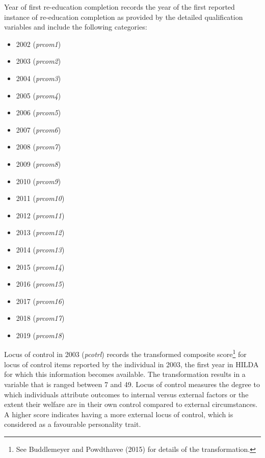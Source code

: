 \documentclass[12pt, a4paper]{article}
\begin{document}
Year of first re-education completion records the year of the first reported instance of re-education completion as provided by the detailed qualification variables and include the following categories:
\begin{itemize}
  \item 2002 (\textit{p\textunderscore{}rcom1})
  \item 2003 (\textit{p\textunderscore{}rcom2})
  \item 2004 (\textit{p\textunderscore{}rcom3})
  \item 2005 (\textit{p\textunderscore{}rcom4})
  \item 2006 (\textit{p\textunderscore{}rcom5})
  \item 2007 (\textit{p\textunderscore{}rcom6})
  \item 2008 (\textit{p\textunderscore{}rcom7})
  \item 2009 (\textit{p\textunderscore{}rcom8})
  \item 2010 (\textit{p\textunderscore{}rcom9})
  \item 2011 (\textit{p\textunderscore{}rcom10})
  \item 2012 (\textit{p\textunderscore{}rcom11})
  \item 2013 (\textit{p\textunderscore{}rcom12})
  \item 2014 (\textit{p\textunderscore{}rcom13})
  \item 2015 (\textit{p\textunderscore{}rcom14})
  \item 2016 (\textit{p\textunderscore{}rcom15})
  \item 2017 (\textit{p\textunderscore{}rcom16})
  \item 2018 (\textit{p\textunderscore{}rcom17})
  \item 2019 (\textit{p\textunderscore{}rcom18})
\end{itemize}  
  
Locus of control in 2003 (\textit{p\textunderscore{}cotrl}) records the transformed composite score\footnote{See Buddlemeyer and Powdthavee (2015) for details of the transformation.} for locus of control items reported by the individual in 2003, the first year in HILDA for which this information becomes available. The transformation results in a variable that is ranged between 7 and 49. Locus of control measures the degree to which individuals attribute outcomes to internal versus external factors or the extent their welfare are in their own control compared to external circumstances. A higher score indicates having a more external locus of control, which is considered as a favourable personality trait. 
\end{document}
